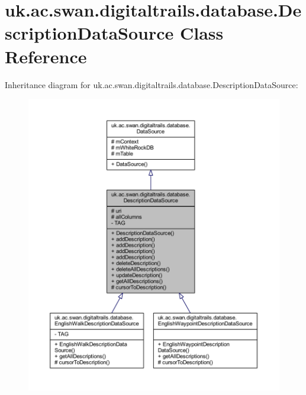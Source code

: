 \hypertarget{classuk_1_1ac_1_1swan_1_1digitaltrails_1_1database_1_1_description_data_source}{\section{uk.\+ac.\+swan.\+digitaltrails.\+database.\+Description\+Data\+Source Class Reference}
\label{classuk_1_1ac_1_1swan_1_1digitaltrails_1_1database_1_1_description_data_source}
}


Inheritance diagram for uk.\+ac.\+swan.\+digitaltrails.\+database.\+Description\+Data\+Source\+:
\nopagebreak
\begin{figure}[H]
\begin{center}
\leavevmode
\includegraphics[width=350pt]{classuk_1_1ac_1_1swan_1_1digitaltrails_1_1database_1_1_description_data_source__inherit__graph}
\end{center}
\end{figure}


